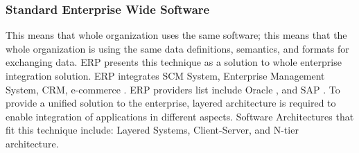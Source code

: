 \documentclass[12pt,a4paper,final,twoside,onecolumn,titlepage]{book}
\begin{document}
\subsubsection{Standard Enterprise Wide Software}
This means that whole organization uses the same software; this means that the whole organization is using the same data definitions, semantics, and formats for exchanging data. \gls{ERP} presents this technique as a solution to whole enterprise integration solution. \gls{ERP} integrates \gls{SCM} System, Enterprise Management System, \gls{CRM}, e-commerce \cite{M41, M42, M43}. \gls{ERP} providers list include Oracle \cite{M44}, and SAP \cite{M45}. To provide a unified solution to the enterprise, layered architecture is required to enable integration of applications in different aspects. Software Architectures that fit this technique include: Layered Systems, Client-Server, and N-tier architecture.
\end{document}
